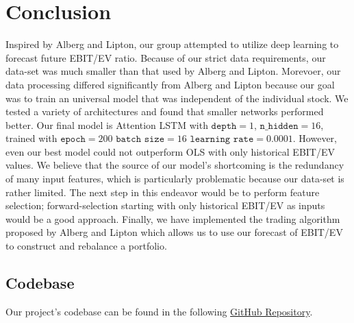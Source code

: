 \documentclass[11pt, letterpaper, headings=standardclasses]{scrartcl}
\begin{document}
	\section{Conclusion}
	Inspired by Alberg and Lipton, our group attempted to utilize deep learning to forecast future EBIT/EV ratio. Because of our strict data requirements, our data-set was much smaller than that used by Alberg and Lipton. Morevoer, our data processing differed significantly from Alberg and Lipton because our goal was to train an universal model that was independent of the individual stock. We tested a variety of architectures and found that smaller networks performed better. Our final model is Attention LSTM with $\texttt{depth}=1$, $\texttt{n\_hidden}=16$, trained with $\texttt{epoch}=200$ $\texttt{batch size}=16$ $\texttt{learning rate}=0.0001$. However, even our best model could not outperform OLS with only historical EBIT/EV values. We believe that the source of our model's shortcoming is the redundancy of many input features, which is particularly problematic because our data-set is rather limited. The next step in this endeavor would be to perform feature selection; forward-selection starting with only historical EBIT/EV as inputs would be a good approach. Finally, we have implemented the trading algorithm proposed by Alberg and Lipton which allows us to use our forecast of EBIT/EV to construct and rebalance a portfolio. 
	
	\begin{appendices}
		\section{Codebase}
			Our project's codebase can be found in the following \href{https://github.com/caseytirshfield/deeplearninveststrat}{GitHub Repository}.
	\end{appendices}
	
	\pagebreak
	
	
	
\end{document}
